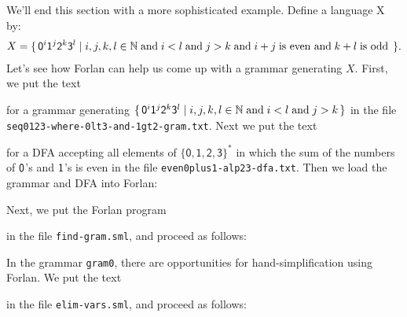 We'll end this section with a more sophisticated example.  Define a
language X by:
\begin{gather*}
X = \{ \, \mathsf{0}^i\mathsf{1}^j\mathsf{2}^k\mathsf{3}^l \mid i, j, k, l\in\mathbb{N} \;\allowbreak\mbox{and}\allowbreak\;
i<l\;\allowbreak\mbox{and}\allowbreak\;j>k\;\allowbreak\mbox{and}\allowbreak\; i + j \;\allowbreak\mbox{is even and}\allowbreak\; k + l \;\allowbreak\mbox{is
odd}\allowbreak\; \, \} .
\end{gather*}
Let's see how Forlan can help us come up with a grammar generating $X$.
First, we put the text

for a grammar generating
$\{ \, \mathsf{0}^i\mathsf{1}^j\mathsf{2}^k\mathsf{3}^l \mid i, j, k, l\in\mathbb{N}
  \;\allowbreak\mbox{and}\allowbreak\; i<l\;\allowbreak\mbox{and}\allowbreak\;j>k \, \}$
in the file \texttt{seq0123-where-0lt3-and-1gt2-gram.txt}. Next we put the text

for a DFA accepting all elements of $\{\mathsf{0,1,2,3}\}^*$ in which
the sum of the numbers of $\mathsf{0}$'s and $\mathsf{1}$'s is even
in the file \texttt{even0plus1-alp23-dfa.txt}.
Then we load the grammar and DFA into Forlan:

Next, we put the Forlan program

in the file \texttt{find-gram.sml}, and proceed as follows:

In the grammar \texttt{gram0}, there are opportunities for
hand-simplification using Forlan. We put the text

in the file \texttt{elim-vars.sml}, and proceed as follows:



